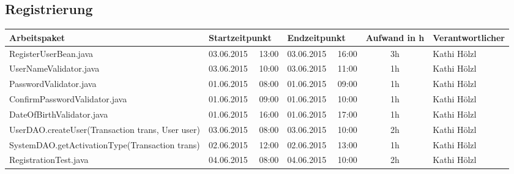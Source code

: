 \begin{landscape}
\subsection{Registrierung}
\begin{tabular}{|p{10.3cm}|p{3.2cm}|p{3.2cm}|c|p{3.5cm}|}
	\hline  \textbf{Arbeitspaket} & \textbf{Startzeitpunkt} & \textbf{Endzeitpunkt} & \textbf{Aufwand in h} & \textbf{Verantwortlicher} \\ 
	\hline   RegisterUserBean.java                                & 03.06.2015 \ \ 13:00     & 03.06.2015 \ \ 16:00     &      3h               & Kathi Hölzl\\
	\hline   UserNameValidator.java                               & 03.06.2015 \ \ 10:00     & 03.06.2015 \ \ 11:00     &      1h               & Kathi Hölzl\\
	\hline   PasswordValidator.java                               & 01.06.2015 \ \ 08:00     & 01.06.2015 \ \ 09:00     &      1h               & Kathi Hölzl\\
	\hline   ConfirmPasswordValidator.java                        & 01.06.2015 \ \ 09:00     & 01.06.2015 \ \ 10:00     &      1h               & Kathi Hölzl\\
	\hline   DateOfBirthValidator.java                            & 01.06.2015 \ \ 16:00     & 01.06.2015 \ \ 17:00     &      1h               & Kathi Hölzl\\
	\hline   UserDAO.createUser(Transaction trans, User user)     & 03.06.2015 \ \ 08:00     & 03.06.2015 \ \ 10:00     &      2h               & Kathi Hölzl\\
	\hline   SystemDAO.getActivationType(Transaction trans)       & 02.06.2015 \ \ 12:00     & 02.06.2015 \ \ 13:00     &      1h               & Kathi Hölzl\\
	\hline   RegistrationTest.java                                & 04.06.2015 \ \ 08:00     & 04.06.2015 \ \ 10:00     &      2h               & Kathi Hölzl\\
	\hline 
\end{tabular} \ \\
\ \\


\end{landscape}
